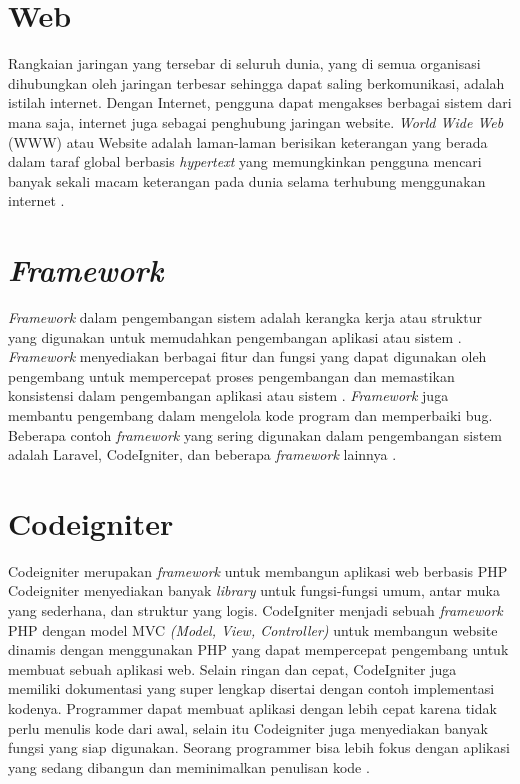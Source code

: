 \section{Web}
Rangkaian jaringan yang tersebar di seluruh dunia, yang di semua organisasi dihubungkan oleh jaringan terbesar sehingga dapat saling berkomunikasi, adalah istilah internet. Dengan Internet, pengguna dapat mengakses berbagai sistem dari mana saja, internet juga sebagai penghubung jaringan website. \textit{World Wide Web} (WWW) atau Website adalah laman-laman berisikan keterangan yang berada dalam taraf global berbasis \textit{hypertext} yang memungkinkan pengguna mencari banyak sekali macam keterangan pada dunia selama terhubung menggunakan internet \cite{tyowati2017implementasi}.
\section{\textit{Framework}}
\textit{Framework} dalam pengembangan sistem adalah kerangka kerja atau struktur yang digunakan untuk memudahkan pengembangan aplikasi atau sistem \cite{sallaby2020perancangan}. \textit{Framework} menyediakan berbagai fitur dan fungsi yang dapat digunakan oleh pengembang untuk mempercepat proses pengembangan dan memastikan konsistensi dalam pengembangan aplikasi atau sistem \cite{simanullang2021sistem}. \textit{Framework} juga membantu pengembang dalam mengelola kode program dan memperbaiki bug. Beberapa contoh \textit{framework} yang sering digunakan dalam pengembangan sistem adalah Laravel, CodeIgniter, dan beberapa \textit{framework} lainnya \cite{Fadllullah2022PengembanganSI}.
\section{Codeigniter}
Codeigniter merupakan \textit{framework} untuk membangun aplikasi web berbasis PHP  Codeigniter menyediakan banyak \textit{library} untuk fungsi-fungsi umum, antar muka yang sederhana, dan struktur yang logis. CodeIgniter menjadi sebuah \textit{framework} PHP dengan model MVC \textit{(Model, View, Controller)} untuk membangun website dinamis dengan menggunakan PHP yang dapat mempercepat pengembang untuk membuat sebuah aplikasi web. Selain ringan dan cepat, CodeIgniter juga memiliki dokumentasi yang super lengkap disertai dengan contoh implementasi kodenya. Programmer dapat membuat aplikasi dengan lebih cepat karena tidak perlu menulis kode dari awal, selain itu Codeigniter juga menyediakan banyak fungsi yang siap digunakan. Seorang programmer bisa lebih fokus dengan aplikasi yang sedang dibangun dan meminimalkan penulisan kode \cite{tyowati2017implementasi}.
